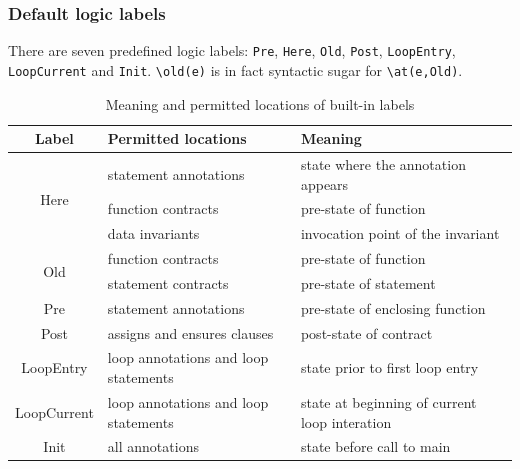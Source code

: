 

\subsubsection*{Default logic labels}\label{sec:default-logic-labels}
There are seven predefined logic labels: \lstinline|Pre|, \lstinline|Here|,
\lstinline|Old|,
\lstinline|Post|, \lstinline|LoopEntry|, \lstinline|LoopCurrent|
and \lstinline|Init|.
\lstinline|\old(e)| is
in fact syntactic sugar for \lstinline|\at(e,Old)|.

\begin{table}
\caption{Meaning and permitted locations of built-in labels}
\label{tab:labels}
\begin{tabular}[t]{|c|p{2.3in}|p{2.3in}|}
\hline
Label & Permitted locations & Meaning \\
\hline
\multirow{3}{*}{Here} & statement annotations & state where the annotation appears \\
                              & function contracts & pre-state of function \\
                              & data invariants & invocation point of the invariant  \\
\hline
\multirow{2}{*}{Old} & function contracts & pre-state of function \\
                             & statement contracts & pre-state of statement \\
\hline
Pre & statement annotations & pre-state of enclosing function \\
\hline
Post & assigns and ensures clauses & post-state of contract \\
\hline
LoopEntry & loop annotations and loop statements & state prior to first loop entry \\
\hline
LoopCurrent & loop annotations and loop statements & state at beginning of current loop interation \\
\hline
Init & all annotations & state before call to main \\
\hline
\end{tabular}
\end{table}

